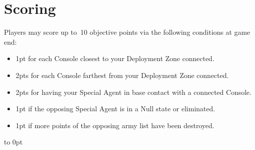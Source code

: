 \section{Scoring}

Players may score up to~10 objective points via the following
conditions at game end:
\begin{itemize}\shortlist
\item 1pt for each Console closest to your Deployment Zone connected.
\item 2pts for each Console farthest from your Deployment Zone
  connected.
\item 2pts for having your Special Agent in base contact with a
  connected Console.
\item 1pt if the opposing Special Agent is in a Null state or eliminated.
\item 1pt if more points of the opposing army list have been destroyed.
\end{itemize}

\vfill
\vbox to 0pt{}